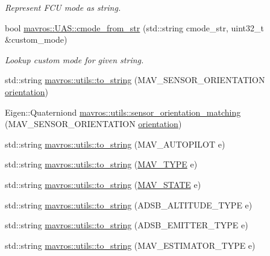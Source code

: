 \begin{DoxyCompactItemize}
\begin{DoxyCompactList}\small\item\em Represent F\+CU mode as string. \end{DoxyCompactList}\item 
bool \mbox{\hyperlink{group__nodelib_gaa280a5a875442cf0683860ff5849916a}{mavros\+::\+U\+A\+S\+::cmode\+\_\+from\+\_\+str}} (std\+::string cmode\+\_\+str, uint32\+\_\+t \&custom\+\_\+mode)
\begin{DoxyCompactList}\small\item\em Lookup custom mode for given string. \end{DoxyCompactList}\item 
std\+::string \mbox{\hyperlink{group__nodelib_ga9e44e56802676785fc349d1d5b808b4c}{mavros\+::utils\+::to\+\_\+string}} (M\+A\+V\+\_\+\+S\+E\+N\+S\+O\+R\+\_\+\+O\+R\+I\+E\+N\+T\+A\+T\+I\+ON \mbox{\hyperlink{structorientation}{orientation}})
\item 
Eigen\+::\+Quaterniond \mbox{\hyperlink{group__nodelib_ga4a6acaf5ab9bea03955ceb53971e2aab}{mavros\+::utils\+::sensor\+\_\+orientation\+\_\+matching}} (M\+A\+V\+\_\+\+S\+E\+N\+S\+O\+R\+\_\+\+O\+R\+I\+E\+N\+T\+A\+T\+I\+ON \mbox{\hyperlink{structorientation}{orientation}})
\item 
std\+::string \mbox{\hyperlink{group__nodelib_gae43f4bc89e45c8218d19cce11c2092bc}{mavros\+::utils\+::to\+\_\+string}} (M\+A\+V\+\_\+\+A\+U\+T\+O\+P\+I\+L\+OT e)
\item 
std\+::string \mbox{\hyperlink{group__nodelib_ga7867559a9a91c6dbc4c7e32e6cc3e018}{mavros\+::utils\+::to\+\_\+string}} (\mbox{\hyperlink{include__v0_89_2mavlink__types_8h_aaf404a9fdbd4c9a05d6cab18790dbb28}{M\+A\+V\+\_\+\+T\+Y\+PE}} e)
\item 
std\+::string \mbox{\hyperlink{group__nodelib_ga6c5689b022d0d0b05dfae454aa234013}{mavros\+::utils\+::to\+\_\+string}} (\mbox{\hyperlink{include__v0_89_2mavlink__types_8h_a3ca5e79cdc1f95d953a6d1d7ab1e90bb}{M\+A\+V\+\_\+\+S\+T\+A\+TE}} e)
\item 
std\+::string \mbox{\hyperlink{group__nodelib_ga84bd1657cfa53e03354e352f2e90e993}{mavros\+::utils\+::to\+\_\+string}} (A\+D\+S\+B\+\_\+\+A\+L\+T\+I\+T\+U\+D\+E\+\_\+\+T\+Y\+PE e)
\item 
std\+::string \mbox{\hyperlink{group__nodelib_gabc30a3ebb411640d92d95e1e2e50be24}{mavros\+::utils\+::to\+\_\+string}} (A\+D\+S\+B\+\_\+\+E\+M\+I\+T\+T\+E\+R\+\_\+\+T\+Y\+PE e)
\item 
std\+::string \mbox{\hyperlink{group__nodelib_ga0e38ef0fd30a43511190d569fdca799a}{mavros\+::utils\+::to\+\_\+string}} (M\+A\+V\+\_\+\+E\+S\+T\+I\+M\+A\+T\+O\+R\+\_\+\+T\+Y\+PE e)

\end{DoxyCompactItemize}
